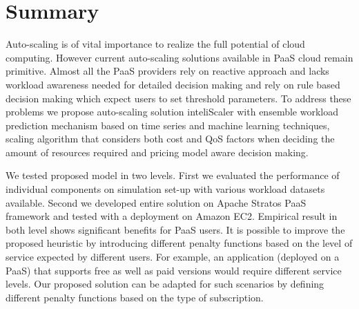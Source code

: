 \section{Summary}

Auto-scaling is of vital importance to realize the full potential of cloud computing. However current auto-scaling solutions available in PaaS cloud remain primitive. Almost all the PaaS providers rely on reactive approach and lacks workload awareness needed for detailed decision making and rely on rule based decision making which expect users to set threshold parameters. To address these problems we propose auto-scaling solution inteliScaler with ensemble workload prediction mechanism based on time series and machine learning techniques, scaling algorithm that considers both cost and QoS factors when deciding the amount of resources required and pricing model aware decision making.

We tested proposed model in two levels. First we evaluated the performance of individual components on simulation set-up with various workload datasets available. Second we developed entire solution on Apache Stratos PaaS framework and tested with a deployment on Amazon EC2. Empirical result in both level shows significant benefits for PaaS users. It is possible to improve the proposed heuristic by introducing different penalty functions  based on the level of service expected by different users. For example, an application (deployed on a PaaS) that supports free as well as paid versions would require different service levels. Our proposed solution can be adapted for such scenarios by defining different penalty functions based on the type of subscription.



